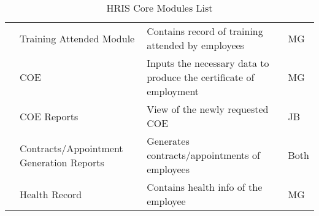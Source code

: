 \begin{table}[H]
\begin{tabularx}{\textwidth}{|p{2cm}|p{3.5cm}|X|p{1.5cm}|}
                        & Training Attended Module                 & Contains record of training attended by employees                                     & MG               \\
                        & COE                                      & Inputs the necessary data to produce the certificate of employment                    & MG               \\
                        & COE Reports                              & View of the newly requested COE                                                       & JB               \\
                        & Contracts/Appointment Generation Reports & Generates contracts/appointments of employees                                         & Both             \\
                        & Health Record                            & Contains health info of the employee                                                  & MG               \\ \bottomrule
    \end{tabularx}
    \caption{HRIS Core Modules List}
    \label{tab:hris-basic-modules}
\end{table}

